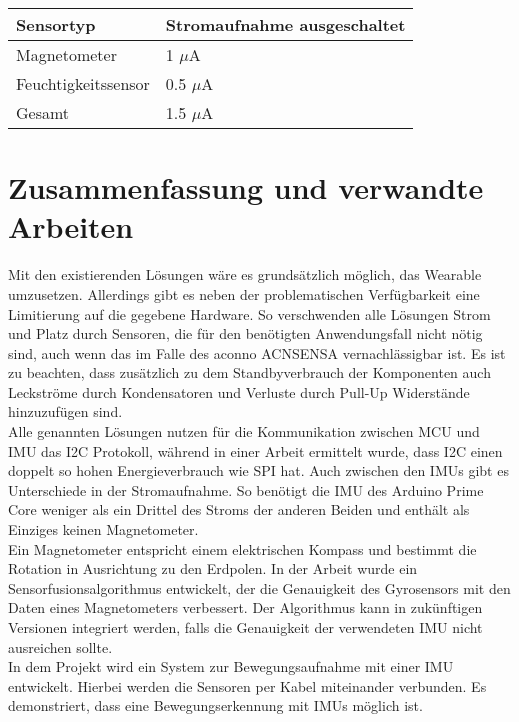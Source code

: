 \begin{minipage}{\linewidth}
	\label{tab:cmp_arduino_primo}
	\begin{tabularx}{\linewidth}{X|X}
		Sensortyp & Stromaufnahme ausgeschaltet\\
		\hline
    Magnetometer & 1 $\mu$A \cite{datasheet_lis3mdl}\\
    Feuchtigkeitssensor & 0.5 $\mu$A \cite{datasheet_hts221}\\
    \hline
    Gesamt & 1.5 $\mu$A\\
	\end{tabularx}
\end{minipage}

\section{Zusammenfassung und verwandte Arbeiten}
Mit den existierenden Lösungen wäre es grundsätzlich möglich, das Wearable umzusetzen.
Allerdings gibt es neben der problematischen Verfügbarkeit eine Limitierung auf die gegebene Hardware.
So verschwenden alle Lösungen Strom und Platz durch Sensoren, die für den benötigten Anwendungsfall nicht nötig sind, auch wenn das im Falle des aconno ACNSENSA vernachlässigbar ist.
Es ist zu beachten, dass zusätzlich zu dem Standbyverbrauch der Komponenten auch Leckströme durch Kondensatoren und Verluste durch Pull-Up Widerstände hinzuzufügen sind.\\
Alle genannten Lösungen nutzen für die Kommunikation zwischen MCU und IMU das I2C Protokoll, während in einer Arbeit \cite{comparison_i2c_spi} ermittelt wurde, dass I2C einen doppelt so hohen Energieverbrauch wie SPI hat.
Auch zwischen den IMUs gibt es Unterschiede in der Stromaufnahme.
So benötigt die IMU des Arduino Prime Core weniger als ein Drittel des Stroms der anderen Beiden und enthält als Einziges keinen Magnetometer.\\
Ein Magnetometer entspricht einem elektrischen Kompass und bestimmt die Rotation in Ausrichtung zu den Erdpolen.
In der Arbeit \cite{sensor_fusion} wurde ein Sensorfusionsalgorithmus entwickelt, der die Genauigkeit des Gyrosensors mit den Daten eines Magnetometers verbessert.
Der Algorithmus kann in zukünftigen Versionen integriert werden, falls die Genauigkeit der verwendeten IMU nicht ausreichen sollte.\\
In dem Projekt \cite{project_chordata} wird ein System zur Bewegungsaufnahme mit einer IMU entwickelt.
Hierbei werden die Sensoren per Kabel miteinander verbunden.
Es demonstriert, dass eine Bewegungserkennung mit IMUs möglich ist.
